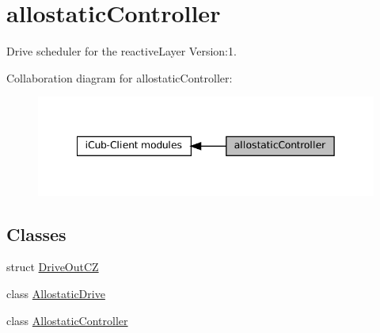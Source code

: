 \hypertarget{group__allostaticController}{}\section{allostatic\+Controller}
\label{group__allostaticController}


Drive scheduler for the reactive\+Layer Version\+:1.  


Collaboration diagram for allostatic\+Controller\+:
\nopagebreak
\begin{figure}[H]
\begin{center}
\leavevmode
\includegraphics[width=342pt]{group__allostaticController}
\end{center}
\end{figure}
\subsection*{Classes}
\begin{DoxyCompactItemize}
\item 
struct \hyperlink{group__allostaticController_structDriveOutCZ}{Drive\+Out\+CZ}
\item 
class \hyperlink{group__allostaticController_classAllostaticDrive}{Allostatic\+Drive}
\item 
class \hyperlink{group__allostaticController_classAllostaticController}{Allostatic\+Controller}
\end{DoxyCompactItemize}
